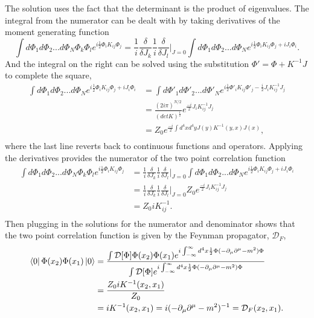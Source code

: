 The solution uses the fact that the determinant is the product of eigenvalues. The integral from the numerator can be dealt with by taking derivatives of the moment generating function 
%
\begin{equation}
\int d\Phi_1 d\Phi_2 ... d\Phi_N \Phi_k\Phi_l e^{i\frac{1}{2}\Phi_{i} K_{ij} \Phi_{j}} 
= \frac{1}{i}\frac{\delta}{\delta J_k}\frac{1}{i}\frac{\delta}{\delta J_l}\Big|_{J=0} 
\int d\Phi_1 d\Phi_2 ... d\Phi_N e^{i\frac{1}{2}\Phi_{i} K_{ij} \Phi_{j} + iJ_i\Phi_i}. 
\end{equation}
And the integral on the right can be solved using the substitution $\Phi' = \Phi + K^{-1}J$ to complete the square, 
%
\begin{equation}
\begin{split}
\int d\Phi_1 d\Phi_2 ... d\Phi_N e^{i\frac{1}{2}\Phi_{i} K_{ij} \Phi_{j} + iJ_i\Phi_i} 
&= \int d\Phi'_1 d\Phi'_2 ... d\Phi'_N e^{i\frac{1}{2}\Phi'_{i} K_{ij} \Phi'_{j} - \frac{i}{2}J_i K^{-1}_{ij} J_j}\\ 
&= \frac{\left( 2i\pi \right)^{N/2}}{ \left( detK \right)^\frac{1}{2}}e^{\frac{-i}{2}J_i K^{-1}_{ij} J_j}\\
&= Z_0e^{\frac{-i}{2}\int d^4x d^4y J(y) K^{-1}(y,x) J(x)},\\
\end{split}
\end{equation}
where the last line reverts back to continuous functions and operators. Applying the derivatives provides the numerator of the two point correlation function 
\begin{equation}
\begin{split}
\int d\Phi_1 d\Phi_2 ... d\Phi_N \Phi_k\Phi_l e^{i\frac{1}{2}\Phi_{i} K_{ij} \Phi_{j}} 
& = \frac{1}{i}\frac{\delta}{\delta J_k}\frac{1}{i}\frac{\delta}{\delta J_l}\Big|_{J=0} \int d\Phi_1 d\Phi_2 ... d\Phi_N e^{i\frac{1}{2}\Phi_{i} K_{ij} \Phi_{j} + iJ_i\Phi_i} \\
& = \frac{1}{i}\frac{\delta}{\delta J_k}\frac{1}{i}\frac{\delta}{\delta J_l}\Big|_{J=0} Z_0e^{\frac{-i}{2}J_i K^{-1}_{ij} J_j} \\ 
& = Z_0 iK^{-1}_{ij}. \\
\end{split}
\end{equation}
Then plugging in the solutions for the numerator and denominator shows that the two point correlation function is given by the Feynman propagator, $\mathcal{D}_F$, 
%
\begin{equation}
\begin{split}
\bra{0}\Phi(x_2)\Phi(x_1)\ket{0} &= 
\frac{\int \mathcal{D}[\Phi]\Phi(x_2)\Phi(x_1)e^{i\int_{-\infty}^{\infty} d^4x \frac{1}{2}\Phi (-\partial_\mu\partial^\mu - m^2)\Phi}}
{\int \mathcal{D}[\Phi]e^{i\int_{-\infty}^{\infty} d^4x \frac{1}{2}\Phi (-\partial_\mu\partial^\mu - m^2)\Phi}} \\
&= \frac{Z_0 iK^{-1}(x_2,x_1)}{Z_0} \\
&= iK^{-1}(x_2,x_1) = i(-\partial_\mu\partial^\mu - m^2)^{-1} = \mathcal{D}_F(x_2,x_1).\\ 
\end{split}
\end{equation}

